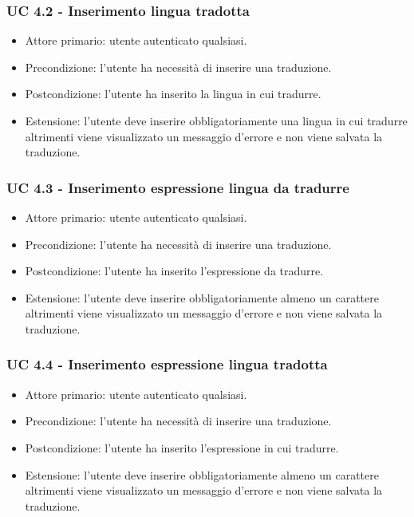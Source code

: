     \subsubsection*{UC 4.2 - Inserimento lingua tradotta}
        \begin{itemize}
            \item Attore primario: utente autenticato qualsiasi.
            \item Precondizione: l'utente ha necessità di inserire una traduzione.
            \item Postcondizione: l'utente ha inserito la lingua in cui tradurre.
            \item Estensione: l'utente deve inserire obbligatoriamente una lingua in cui tradurre altrimenti viene visualizzato un messaggio d'errore e non viene salvata la traduzione.
        \end{itemize}
    \subsubsection*{UC 4.3 - Inserimento espressione lingua da tradurre}
        \begin{itemize}
            \item Attore primario: utente autenticato qualsiasi.
            \item Precondizione: l'utente ha necessità di inserire una traduzione.
            \item Postcondizione: l'utente ha inserito l'espressione da tradurre.
            \item Estensione: l'utente deve inserire obbligatoriamente almeno un carattere altrimenti viene visualizzato un messaggio d'errore e non viene salvata la traduzione.
        \end{itemize}
    \subsubsection*{UC 4.4 - Inserimento espressione lingua tradotta}
        \begin{itemize}
            \item Attore primario: utente autenticato qualsiasi.
            \item Precondizione: l'utente ha necessità di inserire una traduzione.
            \item Postcondizione: l'utente ha inserito l'espressione in cui tradurre.
            \item Estensione: l'utente deve inserire obbligatoriamente almeno un carattere altrimenti viene visualizzato un messaggio d'errore e non viene salvata la traduzione.
        \end{itemize}
